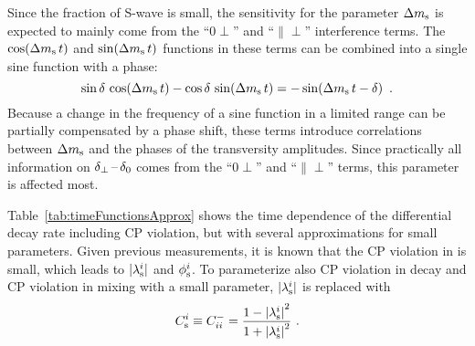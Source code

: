 Since the fraction of S-wave is small, the sensitivity for the parameter $\Delta m_\text{s}$ is expected to mainly come from the ``0$\perp$'' and
``$\parallel\perp$'' interference terms. The $\cos\!\left(\Delta m_\text{s}\, t\right)$ and $\sin\!\left(\Delta m_\text{s}\, t\right)$ functions in these terms can be combined into a single sine function with
a phase:
\begin{equation}
  \sin\delta\, \cos\!\left(\Delta m_\text{s}\, t\right) - \cos\delta\, \sin\!\left(\Delta m_\text{s}\, t\right) = -\sin\!\left(\Delta m_\text{s}\,t - \delta \right) \ .
\end{equation}
Because a change in the frequency of a sine function in a limited range can be partially compensated by a phase shift, these terms
introduce correlations between $\Delta m_\text{s}$ and the phases of the transversity amplitudes. Since practically all information on $\delta_{\perp}\,\text{--}\,\delta_{0}$
comes from the ``0$\perp$'' and ``$\parallel\perp$'' terms, this parameter is affected most.

Table~\ref{tab:timeFunctionsApprox} shows the time dependence of the differential decay rate including CP violation, but with several
approximations for small parameters. Given previous measurements, it is known that the CP violation in \BstoJpsiKK{} is small, which leads
to $|{{\lambda_{\text{s}}^{i}}}|$ and $\phi_\text{s}^{i}$. To parameterize also CP violation in decay and CP violation in mixing with a small
parameter, $|{{\lambda_{\text{s}}^{i}}}|$ is replaced with
\begin{equation}
  \label{eq:CsDef}
  \Csi \equiv \Cf[ii]^- = \frac{1-\lamsiSq}{1+\lamsiSq} \ .
\end{equation}

